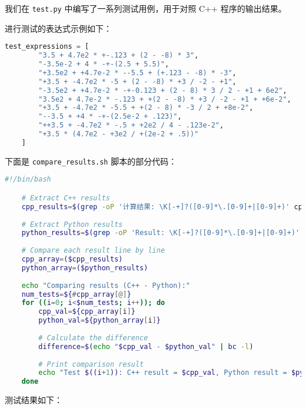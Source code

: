 \documentclass[UTF8]{ctexart}
\begin{document}
我们在 \texttt{test.py} 中编写了一系列测试用例，用于对照 C++ 程序的输出结果。

进行测试的表达式示例如下：

\begin{lstlisting}[language=Python, breaklines=true]
    test_expressions = [
        "3.5 + 4.7e2 * +-.123 + (2 - -8) * 3",                
        "-3.5e-2 + 4 * -+-(2.5 + 5.5)",                       
        "+3.5e2 + +4.7e-2 * --5.5 + (+.123 - -8) * -3",       
        "+3.5 + -4.7e2 * -5 + (2 - -8) * +3 / -2 - +1",       
        "-3.5e2 + +4.7e-2 * -+-0.123 + (2 - 8) * 3 / 2 - +1 + 6e2", 
        "3.5e2 + 4.7e-2 * -.123 + +(2 - -8) * +3 / -2 - +1 + +6e-2", 
        "+3.5 + -4.7e2 * -5.5 + +(2 - 8) * -3 / 2 + +8e-2",   
        "--3.5 + +4 * -+-(2.5e-2 + .123)",                    
        "++3.5 + -4.7e2 * -.5 + +2e2 / 4 - .123e-2",          
        "+3.5 * (4.7e2 - +3e2 / +(2e-2 + .5))"                
    ]
\end{lstlisting}

下面是 \texttt{compare\_results.sh} 脚本的部分代码：

\begin{lstlisting}[language=bash, breaklines=true]
    #!/bin/bash

    # Extract C++ results
    cpp_results=$(grep -oP '计算结果: \K[-+]?([0-9]*\.[0-9]+|[0-9]+)' cpp_output.txt)
    
    # Extract Python results
    python_results=$(grep -oP 'Result: \K[-+]?([0-9]*\.[0-9]+|[0-9]+)' python_output.txt)
    
    # Compare each result line by line
    cpp_array=($cpp_results)
    python_array=($python_results)
    
    echo "Comparing results (C++ - Python):"
    num_tests=${#cpp_array[@]}
    for ((i=0; i<$num_tests; i++)); do
        cpp_val=${cpp_array[i]}
        python_val=${python_array[i]}
    
        # Calculate the difference
        difference=$(echo "$cpp_val - $python_val" | bc -l)
    
        # Print comparison result
        echo "Test $((i+1)): C++ result = $cpp_val, Python result = $python_val, Difference = $difference"
    done
\end{lstlisting}    

测试结果如下：
\end{document}
